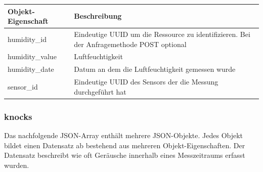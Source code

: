 \begin{table}[H]
  \begin{tabularx}{\textwidth}{lX}
    \textbf{Objekt-Eigenschaft} & \textbf{Beschreibung}                                                                     \\ \toprule
    humidity\_id                & Eindeutige UUID um die Ressource zu identifizieren. Bei der Anfragemethode POST optional  \\
    humidity\_value             & Luftfeuchtigkeit                                                                          \\
    humidity\_date              & Datum an dem die Luftfeuchtigkeit gemessen wurde                                          \\
    sensor\_id                  & Eindeutige UUID des Sensors der die Messung durchgeführt hat                              \\
  \end{tabularx}
\end{table}

\subsubsection{knocks}%
\label{sec:rest.json.knocks}
Das nachfolgende JSON-Array enthält mehrere JSON-Objekte. Jedes Objekt bildet einen Datensatz ab bestehend aus mehreren Objekt-Eigenschaften. Der Datensatz beschreibt wie oft Geräusche innerhalb eines Messzeitraums erfasst wurden.

\begin{jsoncode}
\end{jsoncode}

